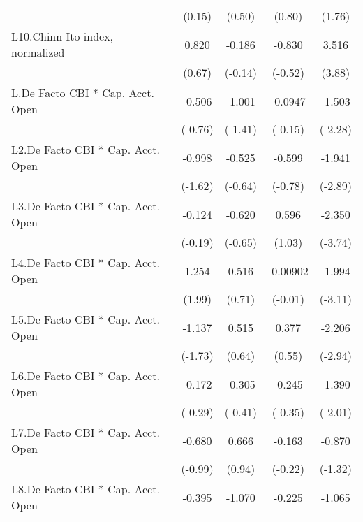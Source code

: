 {\begin{longtable}{l*{4}{c}}
                &   (0.15)         &   (0.50)         &   (0.80)         &   (1.76)         \\
[1em]
L10.Chinn-Ito index, normalized&    0.820         &   -0.186         &   -0.830         &    3.516\sym{***}\\
                &   (0.67)         &  (-0.14)         &  (-0.52)         &   (3.88)         \\
[1em]
L.De Facto CBI * Cap. Acct. Open&   -0.506         &   -1.001         &  -0.0947         &   -1.503\sym{*}  \\
                &  (-0.76)         &  (-1.41)         &  (-0.15)         &  (-2.28)         \\
[1em]
L2.De Facto CBI * Cap. Acct. Open&   -0.998         &   -0.525         &   -0.599         &   -1.941\sym{**} \\
                &  (-1.62)         &  (-0.64)         &  (-0.78)         &  (-2.89)         \\
[1em]
L3.De Facto CBI * Cap. Acct. Open&   -0.124         &   -0.620         &    0.596         &   -2.350\sym{***}\\
                &  (-0.19)         &  (-0.65)         &   (1.03)         &  (-3.74)         \\
[1em]
L4.De Facto CBI * Cap. Acct. Open&    1.254\sym{*}  &    0.516         & -0.00902         &   -1.994\sym{**} \\
                &   (1.99)         &   (0.71)         &  (-0.01)         &  (-3.11)         \\
[1em]
L5.De Facto CBI * Cap. Acct. Open&   -1.137         &    0.515         &    0.377         &   -2.206\sym{**} \\
                &  (-1.73)         &   (0.64)         &   (0.55)         &  (-2.94)         \\
[1em]
L6.De Facto CBI * Cap. Acct. Open&   -0.172         &   -0.305         &   -0.245         &   -1.390\sym{*}  \\
                &  (-0.29)         &  (-0.41)         &  (-0.35)         &  (-2.01)         \\
[1em]
L7.De Facto CBI * Cap. Acct. Open&   -0.680         &    0.666         &   -0.163         &   -0.870         \\
                &  (-0.99)         &   (0.94)         &  (-0.22)         &  (-1.32)         \\
[1em]
L8.De Facto CBI * Cap. Acct. Open&   -0.395         &   -1.070         &   -0.225         &   -1.065         \\

\end{longtable}}
